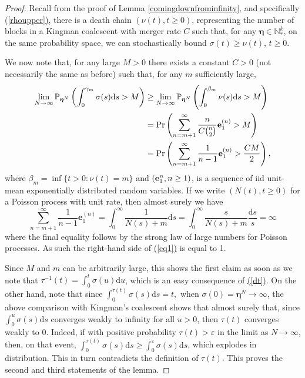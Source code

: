 \documentclass[12pt, leqno]{article}
\renewcommand{\eqref}[1]{\hyperref[#1]{(\ref*{#1})}}
\newcommand{\dd}{{\mathrm d}}
\begin{document}
\begin{proof}
Recall from the proof of Lemma \ref{comingdownfrominfinity}, and specifically \eqref{rhoupper},  there is a death chain $(\nu(t), t\geq0)$, representing the number of blocks in a Kingman coalescent with merger rate $C$  such that, for any $\bm \eta\in\mathbb{N}^k_*$, on the same probability space, we can stochastically bound $\sigma(t)\geq \nu(t)$, $t\geq0$.


\medskip


We now note that, for any large $M>0$ there exists a constant $C>0$ (not necessarily the same as before) such that, for any $m$ sufficiently large,
\begin{align}
\lim_{N\to\infty}\mathbb{P}_{{\bm \eta}^N}\left(\int_0^{\gamma_m} \sigma(s)\dd s> M\right) 
&\geq \lim_{N\to\infty}\mathbb{P}_{{\bm \eta}^N}\left(\int_0^{\beta_m} \nu(s)\dd s> M\right) \notag\\
&= \Pr\left(\sum_{n = m+1}^\infty \frac{n}{C{n\choose 2}}\mathbf{e}^{(n)}_{1} >M\right)\notag\\
&=\Pr\left(\sum_{n = m+1}^\infty \frac{1}{n-1}\mathbf{e}^{(n)}_{1} >\frac{CM}{2}\right),
\label{eq1}
\end{align}
where $\beta_m = \inf\{t>0: \nu(t) = m\}$ and $({\bf e}^{n}_1, n\geq 1)$, is a sequence of iid unit-mean exponentially distributed random variables.
If we write $(N(t), t\geq 0)$ for a Poisson process with unit rate, then almost surely we have
\[
\sum_{n = m+1}^\infty \frac{1}{n-1}\mathbf{e}^{(n)}_{1} = \int_0^\infty \frac{1}{N(s)+m}\dd s 
=\int_0^\infty \frac{s}{N(s)+m}\frac{\dd s}{s} =\infty
\]
where  the final equality follows by the strong law of large numbers for Poisson processes. As such the right-hand side of \eqref{eq1} is equal to 1.

\medskip


Since $M$ and $m$ can be arbitrarily large, this shows the first claim as soon as we note that $\tau^{-1}(t) = \int_0^t \sigma(u)\dd u$, which  is an easy consequence of  \eqref{dt}. On the other hand, note that since 
$
\int_0^{\tau(t)} \sigma(s)\dd s = t,
$
when $\sigma(0)= {\bm \eta}^N \rightarrow\infty$, the above comparison with Kingman's coalescent shows that  almost surely that, since $\int_0^u\sigma(s)\dd s $ converges weakly to infinity for all $u>0$, then $\tau(t)$ converges weakly to 0. Indeed, if with positive probability $\tau(t)>\varepsilon$ in the limit as $N\to\infty$, then, on that event, 
$\int_0^{\tau(t)} \sigma(s)\dd s\geq \int_0^{\varepsilon} \sigma(s)\dd s$, which explodes in distribution. This in turn contradicts the definition of $\tau(t)$. This proves the second and third statements of the lemma.
\end{proof}
\end{document}
